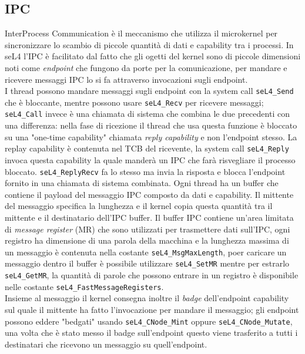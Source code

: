 \subsection{IPC}
InterProcess Communication è il meccanismo che utilizza il microkernel per sincronizzare lo scambio di  piccole quantità di dati e capability tra i processi. In seL4 l'IPC è facilitato dal fatto che gli ogetti del kernel sono di piccole dimensioni noti come \textit{endpoint} che fungono da porte per la comunicazione, per mandare e ricevere messaggi IPC lo si fa attraverso invocazioni sugli endpoint.\\
I thread possono mandare messaggi sugli endpoint  con la system call \texttt{seL4\_Send} che è bloccante, mentre possono usare \texttt{seL4\_Recv} per ricevere messaggi; \texttt{seL4\_Call} invece è una chiamata di sistema che combina le due precedenti con una differenza: nella fase di ricezione il thread che usa questa funzione è bloccato su una "one-time capability" chiamata \textit{reply capability} e non l'endpoint stesso. La replay capability è contenuta nel TCB del ricevente, la system call \texttt{seL4\_Reply} invoca questa capability la quale manderà un IPC che farà risvegliare il processo bloccato. \texttt{seL4\_ReplyRecv} fa lo stesso ma invia la risposta e blocca l'endpoint fornito in una chiamata di sistema combinata. Ogni thread ha un buffer che contiene il payload del messaggio IPC composto da dati e capability. Il mittente del messaggio specifica la lunghezza e il kernel copia questa quantità tra il mittente e il destinatario dell'IPC buffer. Il buffer IPC contiene  un'area limitata di \textit{message register} (MR) che sono utilizzati per trasmettere dati sull'IPC, ogni registro ha dimensione di una parola della macchina e la lunghezza massima di un messaggio è contenuta nella costante \texttt{seL4\_MsgMaxLength}, poer caricare un messaggio dentro il buffer è possibile utilizzare \texttt{seL4\_SetMR} mentre per estrarlo \texttt{seL4\_GetMR}, la quantità di parole che possono entrare in un registro è disponibile nelle costante \texttt{seL4\_FastMessageRegisters}.\\
Insieme al messaggio il kernel consegna inoltre il \textit{badge} dell'endpoint capability sul quale il mittente ha fatto l'invocazione per mandare il messaggio; gli endpoint possono eddere "bedgati" usando \texttt{seL4\_CNode\_Mint} oppure \texttt{seL4\_CNode\_Mutate}, una volta che è stato messo il badge sull'endpoint questo viene trasferito a tutti i destinatari che ricevono un messaggio su quell'endpoint.\\

